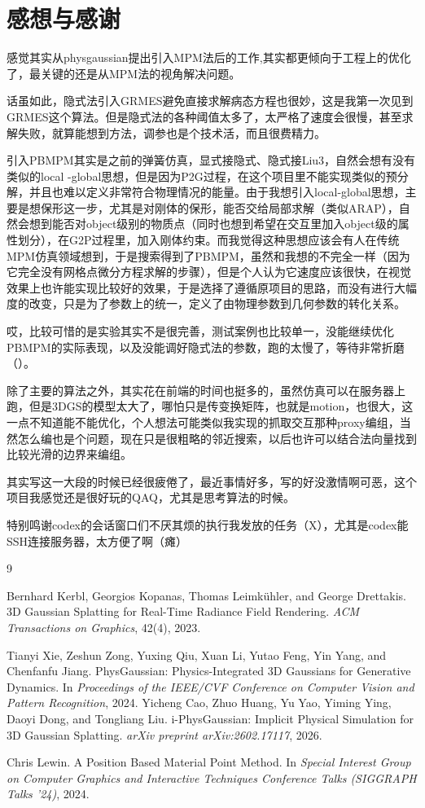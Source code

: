 \documentclass[a4paper]{article}
\begin{document}
\section{感想与感谢}
感觉其实从physgaussian提出引入MPM法后的工作,其实都更倾向于工程上的优化了，最关键的还是从MPM法的视角解决问题。

话虽如此，隐式法引入GRMES避免直接求解病态方程也很妙，这是我第一次见到GRMES这个算法。但是隐式法的各种阈值太多了，太严格了速度会很慢，甚至求解失败，就算能想到方法，调参也是个技术活，而且很费精力。

引入PBMPM其实是之前的弹簧仿真，显式接隐式、隐式接Liu3，自然会想有没有类似的local -global思想，但是因为P2G过程，在这个项目里不能实现类似的预分解，并且也难以定义非常符合物理情况的能量。由于我想引入local-global思想，主要是想保形这一步，尤其是对刚体的保形，能否交给局部求解（类似ARAP），自然会想到能否对object级别的物质点（同时也想到希望在交互里加入object级的属性划分），在G2P过程里，加入刚体约束。而我觉得这种思想应该会有人在传统MPM仿真领域想到，于是搜索得到了PBMPM，虽然和我想的不完全一样（因为它完全没有网格点微分方程求解的步骤），但是个人认为它速度应该很快，在视觉效果上也许能实现比较好的效果，于是选择了遵循原项目的思路，而没有进行大幅度的改变，只是为了参数上的统一，定义了由物理参数到几何参数的转化关系。

哎，比较可惜的是实验其实不是很完善，测试案例也比较单一，没能继续优化PBMPM的实际表现，以及没能调好隐式法的参数，跑的太慢了，等待非常折磨（）。

除了主要的算法之外，其实花在前端的时间也挺多的，虽然仿真可以在服务器上跑，但是3DGS的模型太大了，哪怕只是传变换矩阵，也就是motion，也很大，这一点不知道能不能优化，个人想法可能类似我实现的抓取交互那种proxy编组，当然怎么编也是个问题，现在只是很粗略的邻近搜索，以后也许可以结合法向量找到比较光滑的边界来编组。

其实写这一大段的时候已经很疲倦了，最近事情好多，写的好没激情啊可恶，这个项目我感觉还是很好玩的QAQ，尤其是思考算法的时候。

特别鸣谢codex的会话窗口们不厌其烦的执行我发放的任务（X），尤其是codex能SSH连接服务器，太方便了啊（瘫）
\begin{thebibliography}{9}

Bernhard Kerbl, Georgios Kopanas, Thomas Leimk{\"u}hler, and George Drettakis.
\newblock 3D Gaussian Splatting for Real-Time Radiance Field Rendering.
\newblock \emph{ACM Transactions on Graphics}, 42(4), 2023.

Tianyi Xie, Zeshun Zong, Yuxing Qiu, Xuan Li, Yutao Feng, Yin Yang, and Chenfanfu Jiang.
\newblock PhysGaussian: Physics-Integrated 3D Gaussians for Generative Dynamics.
\newblock In \emph{Proceedings of the IEEE/CVF Conference on Computer Vision and Pattern Recognition}, 2024.
Yicheng Cao, Zhuo Huang, Yu Yao, Yiming Ying, Daoyi Dong, and Tongliang Liu.
\newblock i-PhysGaussian: Implicit Physical Simulation for 3D Gaussian Splatting.
\newblock \emph{arXiv preprint arXiv:2602.17117}, 2026.

Chris Lewin.
\newblock A Position Based Material Point Method.
\newblock In \emph{Special Interest Group on Computer Graphics and Interactive Techniques Conference Talks (SIGGRAPH Talks '24)}, 2024.
\end{thebibliography}
\end{document}

